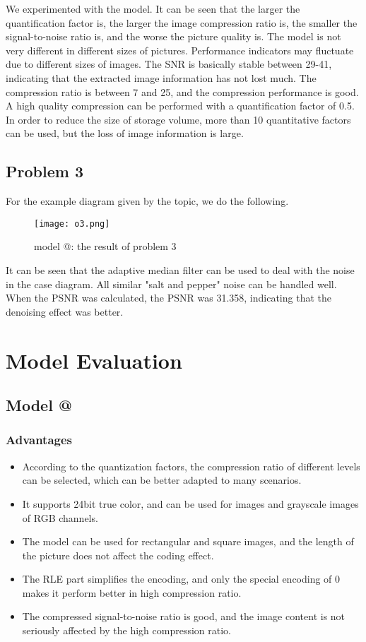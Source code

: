 \documentclass{mcmthesis}
\makeatletter
\newcommand{\Rmnum}[1]{\expandafter\@slowromancap\romannumeral #1@}
\makeatother
\begin{document}
We experimented with the model. It can be seen that the larger the quantification factor is, the larger the image compression ratio is, the smaller the signal-to-noise ratio is, and the worse the picture quality is. The model is not very different in different sizes of pictures. Performance indicators may fluctuate due to different sizes of images.
The SNR is basically stable between 29-41, indicating that the extracted image information has not lost much. The compression ratio is between 7 and 25, and the compression performance is good.
A high quality compression can be performed with a quantification factor of 0.5. In order to reduce the size of storage volume, more than 10 quantitative factors can be used, but the loss of image information is large.

\subsection{Problem 3}
For the example diagram given by the topic, we do the following.
\begin{figure}[h]
\centering
\texttt{[image: o3.png]}
\caption{model \Rmnum{2}: the result of problem 3} \label{fig: model \Rmnum{2}: the result of problem 3}
\end{figure} 

It can be seen that the adaptive median filter can be used to deal with the noise in the case diagram.
All similar "salt and pepper" noise can be handled well.
When the PSNR was calculated, the PSNR was 31.358, indicating that the denoising effect was better.

\section{Model Evaluation}
\subsection{Model \Rmnum{1}}
\subsubsection{Advantages}
\begin{itemize}
  \item According to the quantization factors, the compression ratio of different levels can be selected, which can be better adapted to many scenarios.
  \item It supports 24bit true color, and can be used for images and grayscale images of RGB channels.
  \item The model can be used for rectangular and square images, and the length of the picture does not affect the coding effect.
  \item The RLE part simplifies the encoding, and only the special encoding of 0 makes it perform better in high compression ratio.
  \item The compressed signal-to-noise ratio is good, and the image content is not seriously affected by the high compression ratio.
\end{itemize}
\end{document}
